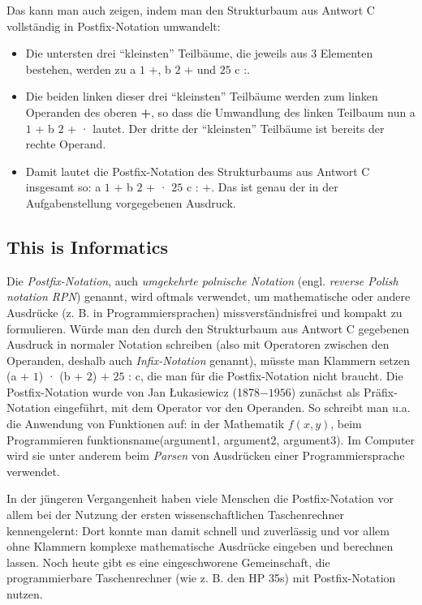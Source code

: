 \documentclass[a4paper,11pt]{report}
\newcommand{\BrochureInlineCode}[1]{{\ttfamily #1}}
\begin{document}
Das kann man auch zeigen, indem man den Strukturbaum aus Antwort C vollständig in Postfix-Notation umwandelt:

\begin{itemize}
  \item Die untersten drei \enquote{kleinsten} Teilbäume, die jeweils aus $3$ Elementen bestehen, werden zu a $1$ +, b $2$ + und $25$ c :.
  \item Die beiden linken dieser drei \enquote{kleinsten} Teilbäume werden zum linken Operanden des oberen \textbf{+}, so dass die Umwandlung des linken Teilbaum nun a $1$ + b $2$ + · lautet. Der dritte der \enquote{kleinsten} Teilbäume ist bereits der rechte Operand.
  \item Damit lautet die Postfix-Notation des Strukturbaums aus Antwort C insgesamt so:  a $1$ + b $2$ + · $25$ c : +.  Das ist genau der in der Aufgabenstellung vorgegebenen Ausdruck.
\end{itemize}


\subsection*{This is Informatics}

Die \emph{Postfix-Notation}, auch \emph{umgekehrte polnische Notation} (engl. \emph{reverse Polish notation RPN}) genannt, wird oftmals verwendet, um mathematische oder andere Ausdrücke (z. B. in Programmiersprachen) missverständnisfrei und kompakt zu formulieren. Würde man den durch den Strukturbaum aus Antwort C gegebenen Ausdruck in normaler Notation schreiben (also mit Operatoren zwischen den Operanden, deshalb auch \emph{Infix-Notation} genannt), müsste man Klammern setzen (a + $1$) · (b + $2$) + $25$ : c, die man für die Postfix-Notation nicht braucht. Die Postfix-Notation wurde von Jan Łukasiewicz (1878$-1956$) zunächst als Präfix-Notation eingeführt, mit dem Operator vor den Operanden.  So schreibt man u.a. die Anwendung von Funktionen auf: in der Mathematik ${f(x, y)}$, beim Programmieren \BrochureInlineCode{funktionsname(argument1, argument2, argument3)}.  Im Computer wird sie unter anderem beim \emph{Parsen} von Ausdrücken einer Programmiersprache verwendet.

In der jüngeren Vergangenheit haben viele Menschen die Postfix-Notation vor allem bei der Nutzung der ersten wissenschaftlichen Taschenrechner kennengelernt:  Dort konnte man damit schnell und zuverlässig und vor allem ohne Klammern komplexe mathematische Ausdrücke eingeben und berechnen lassen.  Noch heute gibt es eine eingeschworene Gemeinschaft, die programmierbare Taschenrechner (wie z. B. den HP 35s) mit Postfix-Notation nutzen.
\end{document}
